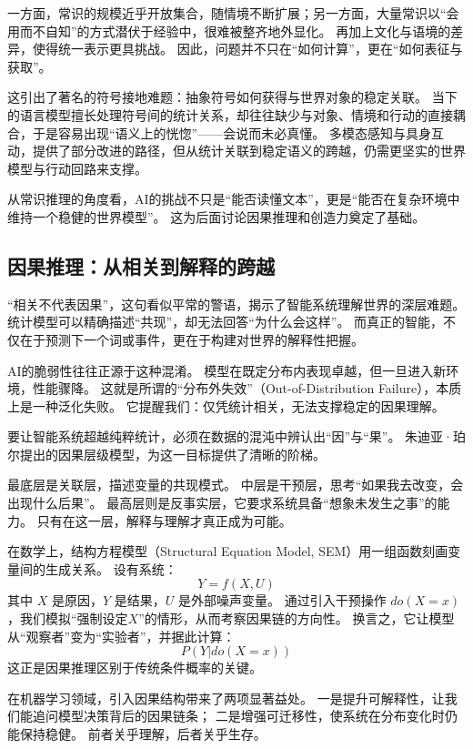 一方面，常识的规模近乎开放集合，随情境不断扩展；另一方面，大量常识以“会用而不自知”的方式潜伏于经验中，很难被整齐地外显化。
再加上文化与语境的差异，使得统一表示更具挑战。
因此，问题并不只在“如何计算”，更在“如何表征与获取”。

这引出了著名的符号接地难题：抽象符号如何获得与世界对象的稳定关联。
当下的语言模型擅长处理符号间的统计关系，却往往缺少与对象、情境和行动的直接耦合，于是容易出现“语义上的恍惚”——会说而未必真懂。
多模态感知与具身互动，提供了部分改进的路径，但从统计关联到稳定语义的跨越，仍需更坚实的世界模型与行动回路来支撑。

从常识推理的角度看，AI的挑战不只是“能否读懂文本”，更是“能否在复杂环境中维持一个稳健的世界模型”。
这为后面讨论因果推理和创造力奠定了基础。

\subsection{因果推理：从相关到解释的跨越}

“相关不代表因果”，这句看似平常的警语，揭示了智能系统理解世界的深层难题。
统计模型可以精确描述“共现”，却无法回答“为什么会这样”。
而真正的智能，不仅在于预测下一个词或事件，更在于构建对世界的解释性把握。

AI的脆弱性往往正源于这种混淆。
模型在既定分布内表现卓越，但一旦进入新环境，性能骤降。
这就是所谓的“分布外失效”（Out-of-Distribution Failure），本质上是一种泛化失败。
它提醒我们：仅凭统计相关，无法支撑稳定的因果理解。

要让智能系统超越纯粹统计，必须在数据的混沌中辨认出“因”与“果”。
朱迪亚·珀尔提出的因果层级模型，为这一目标提供了清晰的阶梯。

最底层是关联层，描述变量的共现模式。
中层是干预层，思考“如果我去改变，会出现什么后果”。
最高层则是反事实层，它要求系统具备“想象未发生之事”的能力。
只有在这一层，解释与理解才真正成为可能。

在数学上，结构方程模型（Structural Equation Model, SEM）用一组函数刻画变量间的生成关系。
设有系统：
\begin{equation}
Y = f(X, U)
\end{equation}
其中 $X$ 是原因，$Y$ 是结果，$U$ 是外部噪声变量。
通过引入干预操作 $do(X=x)$，我们模拟“强制设定$X$”的情形，从而考察因果链的方向性。
换言之，它让模型从“观察者”变为“实验者”，并据此计算：
\begin{equation}
P(Y|do(X=x))
\end{equation}
这正是因果推理区别于传统条件概率的关键。

在机器学习领域，引入因果结构带来了两项显著益处。
一是提升可解释性，让我们能追问模型决策背后的因果链条；
二是增强可迁移性，使系统在分布变化时仍能保持稳健。
前者关乎理解，后者关乎生存。

